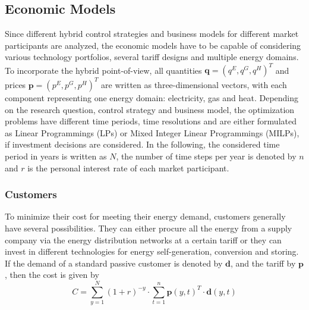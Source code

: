 \documentclass[review]{elsarticle}
\begin{document}
\subsection{Economic Models}
\label{sec:econ-3}
\noindent
Since different hybrid control strategies and business models for
different market participants are analyzed, the economic models have
to be capable of considering various technology portfolios, several
tariff designs and multiple energy domains. To incorporate the hybrid
point-of-view, all quantities $\mathbf{q}=(q^E, q^G, q^H )^T$ and prices $\mathbf{p}=(p^E, p^G, p^H )^T$ are written as
three-dimensional vectors,
with each component representing one energy domain: electricity,
gas and heat. Depending on the research question, control strategy and
business model, the optimization problems have different time periods,
time resolutions and are either formulated as Linear Programmings
(LPs) or Mixed Integer Linear Programmings (MILPs), if investment
decisions are considered. In the following, the considered
time period in years is written as $N$, the number of time steps per
year is denoted by $n$ and $r$ is the personal interest rate of each
market participant. 


\subsubsection{Customers}
\noindent
To minimize their cost for meeting their energy demand, customers
generally have several possibilities. They can either procure all the
energy from a supply company via the energy distribution networks at a
certain tariff or they can invest in different technologies for energy
self-generation, conversion and storing.
If the demand of a standard passive customer is
denoted by $\mathbf{d}$, and the tariff by $\mathbf{p}$, then the cost is given by 
\begin{equation}
  C = \sum_{y=1}^{N}(1+r)^{-y} \cdot \sum_{t=1}^{n} \mathbf{p}(y,t)^{T} \cdot \mathbf{d}(y,t)
\end{equation}
\end{document}
